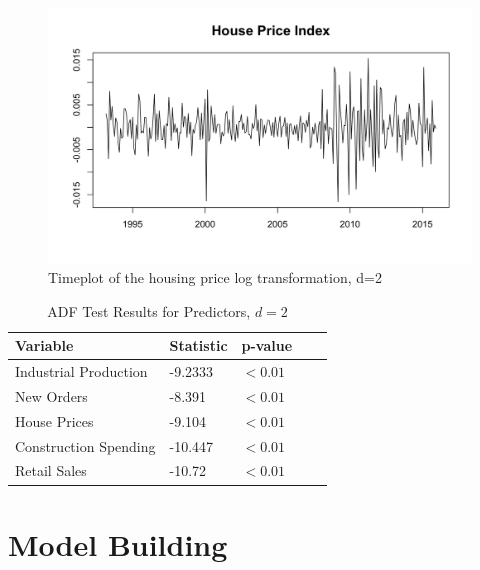 \documentclass[twoside,twocolumn]{article}
\begin{document}
		\begin{figure}[htb]
		\centering
		\caption{Timeplot of the housing price log transformation, d=2}
		\label{fig:loghouse}
		\includegraphics[width=\linewidth]{images/houseprice}
	\end{figure}



\begin{table}[H]
		 \centering
		 \caption{ADF Test Results for Predictors, \(d=2\)}
		 \label{tab:ADF2}
		 \begin{tabular}{lllll}
		 \hline
		 \textbf{Variable} & \textbf{Statistic}  & \textbf{p-value}\\ \hline
		  Industrial Production & -9.2333  &\( < 0.01\)\\
		  New Orders &  -8.391  & \( < 0.01\)\\
		  House Prices &  -9.104  & \( < 0.01\)\\
		  Construction Spending &  -10.447 &  \( < 0.01\)\\
		  Retail Sales &  -10.72 &  \( < 0.01\)\\ \hline
		 \end{tabular}
		 \end{table}







\section{Model Building}
\end{document}
